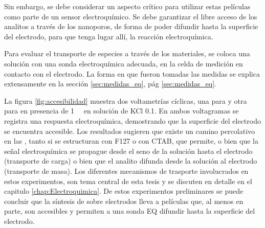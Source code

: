 			Sin embargo, se debe considerar un aspecto crítico para utilizar estas películas como parte de un sensor electroquímico. Se debe garantizar el libre acceso de los analitos a través de los nanoporos, de forma de poder difundir hasta la superficie del electrodo, para que tenga lugar allí, la reacción electroquímica.

			Para evaluar el transporte de especies a través de los materiales, se coloca una solución con una sonda electroquímica adecuada, en la celda de medición en contacto con el electrodo. La forma en que fueron tomadas las medidas se explica extensamente en la sección \ref{sec:medidas_eq}, pág \ref{sec:medidas_eq}. 

			La figura \ref{fig:accesibilidad} muestra dos voltametrías cíclicas, una para \pdmF\space y otra para \pdmC\space en presencia de \aminorutenio\space \SI{1}{\milli\Molar} en solución de KCl \SI{0.1}{\Molar}. En ambos voltagramas se registra una respuesta electroquímica, demostrando que la superficie del electrodo se encuentra accesible. Los resultados sugieren que existe un camino percolativo en las \pdm, tanto si se estructuran con F127 o con CTAB, que permite, o bien que la señal electroquímica se propague desde el seno de la solución hasta el electrodo (transporte de carga) o bien que el analito difunda desde la solución al electrodo (transporte de masa). Los diferentes mecanismos de trasporte involucrados en estos experimentos, son tema central de esta tesis y se discuten en detalle en el capitulo \ref{chap:Electroquimica}. De estos experimentos preliminares se puede concluir que la síntesis de \pdm\space sobre electrodos lleva a películas que, al menos en parte, son accesibles y permiten a una sonda EQ difundir hasta la superficie del electrodo.   

